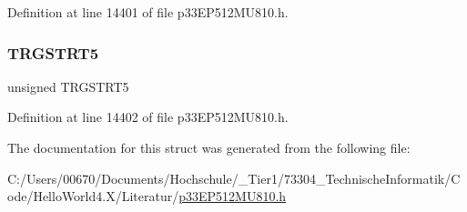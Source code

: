 Definition at line 14401 of file p33\+E\+P512\+M\+U810.\+h.

\mbox{\label{structtag_t_r_g_c_o_n2_b_i_t_s_aabeb06bb6258310e01e1a0cd96bf30ca}} 
\subsubsection{\texorpdfstring{T\+R\+G\+S\+T\+R\+T5}{TRGSTRT5}}
{\footnotesize\ttfamily unsigned T\+R\+G\+S\+T\+R\+T5}



Definition at line 14402 of file p33\+E\+P512\+M\+U810.\+h.



The documentation for this struct was generated from the following file\+:\begin{DoxyCompactItemize}
\item 
C\+:/\+Users/00670/\+Documents/\+Hochschule/\+\_\+\+Tier1/73304\+\_\+\+Technische\+Informatik/\+Code/\+Hello\+World4.\+X/\+Literatur/\hyperlink{p33_e_p512_m_u810_8h}{p33\+E\+P512\+M\+U810.\+h}\end{DoxyCompactItemize}
